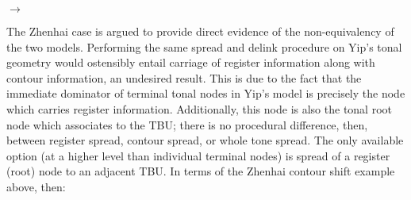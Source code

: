 \documentclass{article}
\begin{document}
\begin{center}
\hspace{.3cm}
$\rightarrow$
\hspace{.3cm}
\end{center} \par
The Zhenhai case is argued to provide direct evidence of the non-equivalency of the two models. Performing the same spread and delink procedure on Yip's tonal geometry would ostensibly entail carriage of register information along with contour information, an undesired result. This is due to the fact that the immediate dominator of terminal tonal nodes in Yip's model is precisely the node which carries register information. Additionally, this node is also the tonal root node which associates to the TBU; there is no procedural difference, then, between register spread, contour spread, or whole tone spread. The only available option (at a higher level than individual terminal nodes) is spread of a register (root) node to an adjacent TBU. In terms of the Zhenhai contour shift example above, then:
\end{document}
